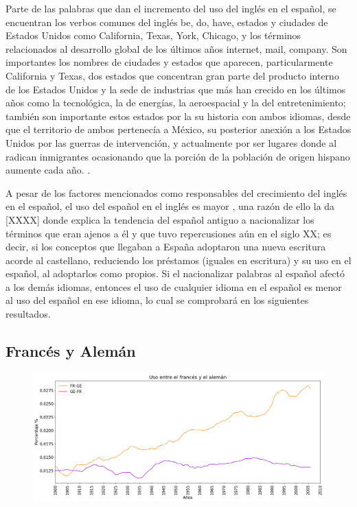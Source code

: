 Parte de las palabras que dan el incremento del uso del inglés en el español, se encuentran los verbos comunes del inglés be, do, have, estados y ciudades de Estados Unidos  como California, Texas, York, Chicago, y los términos relacionados al desarrollo global de los últimos años internet, mail, company.  Son importantes los nombres de ciudades y estados que aparecen, particularmente California y Texas, dos estados que concentran gran parte del producto interno de los Estados Unidos y la sede de industrias que más han crecido en los últimos años como la tecnológica,  la de energías, la aeroespacial y  la del entretenimiento; también son importante estos estados por la su historia con ambos idiomas, desde que el territorio de ambos pertenecía  a México,  su posterior anexión a los Estados Unidos por las guerras  de intervención,  y actualmente por ser lugares donde al radican inmigrantes ocasionando que la porción de la población de origen hispano aumente cada año. .

A pesar de los factores mencionados como responsables del crecimiento del inglés en el español,  el uso del español en el inglés es mayor , una razón de ello la da [XXXX] donde explica la tendencia del español antiguo a nacionalizar los términos que eran ajenos a él y que tuvo repercusiones aún en el siglo XX; es decir, si los conceptos que llegaban a España adoptaron una nueva escritura acorde al castellano,  reduciendo los préstamos (iguales en escritura)  y su uso en el español, al adoptarlos como propios. Si el nacionalizar palabras al español afectó a los demás idiomas, entonces el uso de cualquier idioma en el español es menor al uso del español en ese idioma, lo cual se comprobará en los siguientes resultados.



\subsection{Francés y Alemán}

\begin{figure}[h!]
	\centering
	\includegraphics[scale=.38]{Cap_4/SF_2_S2_FR.png}
	\label{SF_FG}
	\caption{}
\end{figure}

